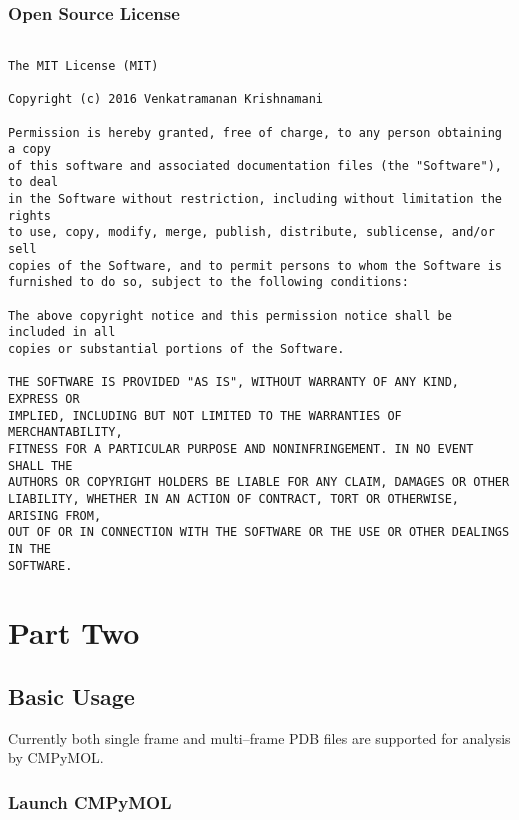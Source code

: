 \documentclass[11pt,fleqn]{book} %
\begin{document}
\section{Open Source License}\label{license}
\begin{lstlisting}

The MIT License (MIT)

Copyright (c) 2016 Venkatramanan Krishnamani

Permission is hereby granted, free of charge, to any person obtaining a copy
of this software and associated documentation files (the "Software"), to deal
in the Software without restriction, including without limitation the rights
to use, copy, modify, merge, publish, distribute, sublicense, and/or sell
copies of the Software, and to permit persons to whom the Software is
furnished to do so, subject to the following conditions:

The above copyright notice and this permission notice shall be included in all
copies or substantial portions of the Software.

THE SOFTWARE IS PROVIDED "AS IS", WITHOUT WARRANTY OF ANY KIND, EXPRESS OR
IMPLIED, INCLUDING BUT NOT LIMITED TO THE WARRANTIES OF MERCHANTABILITY,
FITNESS FOR A PARTICULAR PURPOSE AND NONINFRINGEMENT. IN NO EVENT SHALL THE
AUTHORS OR COPYRIGHT HOLDERS BE LIABLE FOR ANY CLAIM, DAMAGES OR OTHER
LIABILITY, WHETHER IN AN ACTION OF CONTRACT, TORT OR OTHERWISE, ARISING FROM,
OUT OF OR IN CONNECTION WITH THE SOFTWARE OR THE USE OR OTHER DEALINGS IN THE
SOFTWARE.
\end{lstlisting}



\part{Part Two}

\chapter{Basic Usage}

Currently both single frame and multi--frame PDB files are supported for analysis by CMPyMOL.

\section{Launch CMPyMOL}
\end{document}
